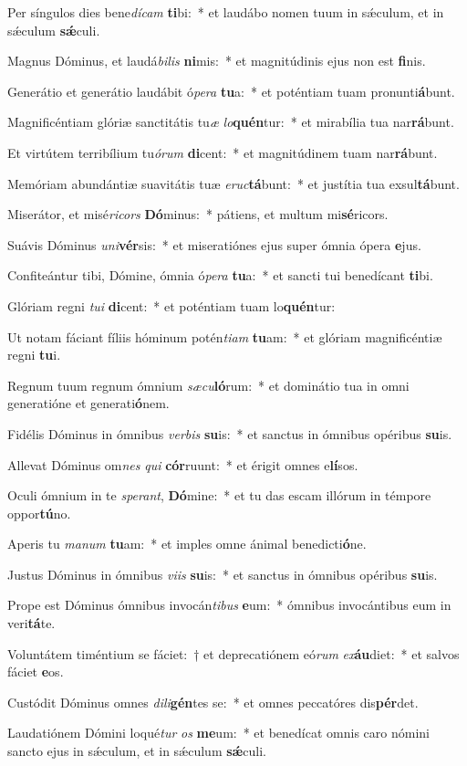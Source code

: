 \item Per síngulos dies bene\textit{dí}\textit{cam} \textbf{ti}bi:~* et laudábo nomen tuum in sǽculum, et in sǽculum \textbf{sǽ}culi.
\item Magnus Dóminus, et laudá\textit{bi}\textit{lis} \textbf{ni}mis:~* et magnitúdinis ejus non est \textbf{fi}nis.
\item Generátio et generátio laudábit ó\textit{pe}\textit{ra} \textbf{tu}a:~* et poténtiam tuam pronunti\textbf{á}bunt.
\item Magnificéntiam glóriæ sanctitátis tu\textit{æ} \textit{lo}\textbf{quén}tur:~* et mirabília tua nar\textbf{rá}bunt.
\item Et virtútem terribílium tu\textit{ó}\textit{rum} \textbf{di}cent:~* et magnitúdinem tuam nar\textbf{rá}bunt.
\item Memóriam abundántiæ suavitátis tuæ \textit{e}\textit{ruc}\textbf{tá}bunt:~* et justítia tua exsul\textbf{tá}bunt.
\item Miserátor, et misé\textit{ri}\textit{cors} \textbf{Dó}minus:~* pátiens, et multum mi\textbf{sé}ricors.
\item Suávis Dóminus \textit{u}\textit{ni}\textbf{vér}sis:~* et miseratiónes ejus super ómnia ópera \textbf{e}jus.
\item Confiteántur tibi, Dómine, ómnia ó\textit{pe}\textit{ra} \textbf{tu}a:~* et sancti tui benedícant \textbf{ti}bi.
\item Glóriam regni \textit{tu}\textit{i} \textbf{di}cent:~* et poténtiam tuam lo\textbf{quén}tur:
\item Ut notam fáciant fíliis hóminum potén\textit{ti}\textit{am} \textbf{tu}am:~* et glóriam magnificéntiæ regni \textbf{tu}i.
\item Regnum tuum regnum ómnium \textit{sæ}\textit{cu}\textbf{ló}rum:~* et dominátio tua in omni generatióne et generati\textbf{ó}nem.
\item Fidélis Dóminus in ómnibus \textit{ver}\textit{bis} \textbf{su}is:~* et sanctus in ómnibus opéribus \textbf{su}is.
\item Allevat Dóminus om\textit{nes} \textit{qui} \textbf{cór}ruunt:~* et érigit omnes e\textbf{lí}sos.
\item Oculi ómnium in te \textit{spe}\textit{rant}, \textbf{Dó}mine:~* et tu das escam illórum in témpore oppor\textbf{tú}no.
\item Aperis tu \textit{ma}\textit{num} \textbf{tu}am:~* et imples omne ánimal benedicti\textbf{ó}ne.
\item Justus Dóminus in ómnibus \textit{vi}\textit{is} \textbf{su}is:~* et sanctus in ómnibus opéribus \textbf{su}is.
\item Prope est Dóminus ómnibus invocán\textit{ti}\textit{bus} \textbf{e}um:~* ómnibus invocántibus eum in veri\textbf{tá}te.
\item Voluntátem timéntium se fáciet:~† et deprecatiónem eó\textit{rum} \textit{ex}\textbf{áu}diet:~* et salvos fáciet \textbf{e}os.
\item Custódit Dóminus omnes \textit{di}\textit{li}\textbf{gén}tes se:~* et omnes peccatóres dis\textbf{pér}det.
\item Laudatiónem Dómini loqué\textit{tur} \textit{os} \textbf{me}um:~* et benedícat omnis caro nómini sancto ejus in sǽculum, et in sǽculum \textbf{sǽ}culi.
